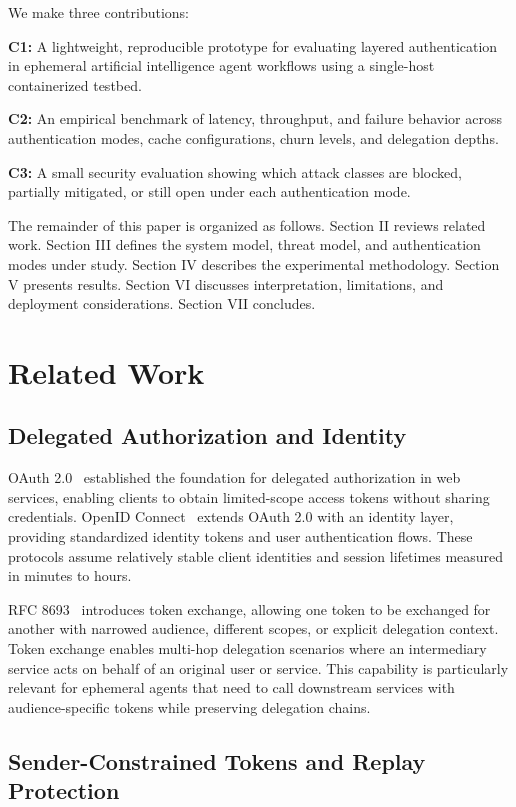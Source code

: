 \documentclass[conference,10pt]{IEEEtran}
\begin{document}
We make three contributions:

\textbf{C1:} A lightweight, reproducible prototype for evaluating layered authentication in ephemeral artificial intelligence agent workflows using a single-host containerized testbed.

\textbf{C2:} An empirical benchmark of latency, throughput, and failure behavior across authentication modes, cache configurations, churn levels, and delegation depths.

\textbf{C3:} A small security evaluation showing which attack classes are blocked, partially mitigated, or still open under each authentication mode.

The remainder of this paper is organized as follows. Section II reviews related work. Section III defines the system model, threat model, and authentication modes under study. Section IV describes the experimental methodology. Section V presents results. Section VI discusses interpretation, limitations, and deployment considerations. Section VII concludes.

\section{Related Work}

\subsection{Delegated Authorization and Identity}

OAuth 2.0~\cite{rfc6749} established the foundation for delegated authorization in web services, enabling clients to obtain limited-scope access tokens without sharing credentials. OpenID Connect~\cite{oidc_core} extends OAuth 2.0 with an identity layer, providing standardized identity tokens and user authentication flows. These protocols assume relatively stable client identities and session lifetimes measured in minutes to hours.

RFC 8693~\cite{rfc8693} introduces token exchange, allowing one token to be exchanged for another with narrowed audience, different scopes, or explicit delegation context. Token exchange enables multi-hop delegation scenarios where an intermediary service acts on behalf of an original user or service. This capability is particularly relevant for ephemeral agents that need to call downstream services with audience-specific tokens while preserving delegation chains.

\subsection{Sender-Constrained Tokens and Replay Protection}
\end{document}
